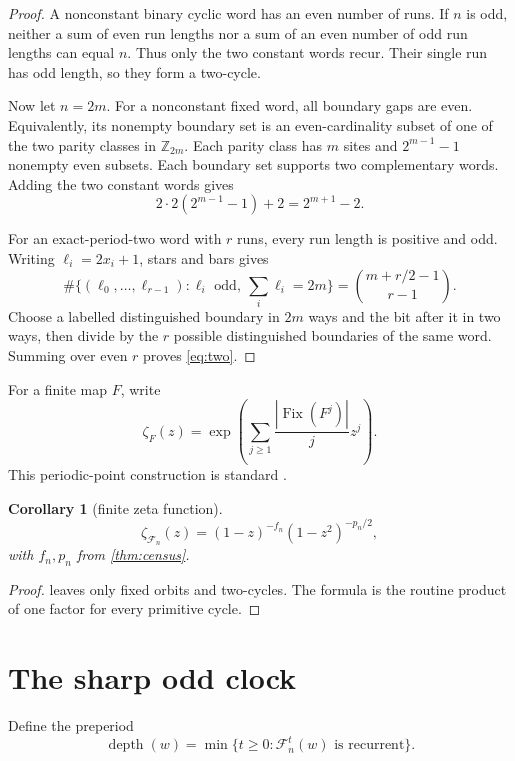 \documentclass[11pt,a4paper]{amsart}
\newtheorem{corollary}[theorem]{Corollary}
\theoremstyle{definition}
\theoremstyle{remark}
\newcommand{\F}{\mathcal F}
\newcommand{\depth}{\operatorname{depth}}
\newcommand{\Fix}{\operatorname{Fix}}
\begin{document}
\begin{proof}
A nonconstant binary cyclic word has an even number of runs.  If \(n\) is
odd, neither a sum of even run lengths nor a sum of an even number of odd
run lengths can equal \(n\).  Thus only the two constant words recur.  Their
single run has odd length, so they form a two-cycle.

Now let \(n=2m\).  For a nonconstant fixed word, all boundary gaps are even.
Equivalently, its nonempty boundary set is an even-cardinality subset of one
of the two parity classes in \(\mathbb Z_{2m}\).  Each parity class has
\(m\) sites and \(2^{m-1}-1\) nonempty even subsets.  Each boundary set
supports two complementary words.  Adding the two constant words gives
\[
       2\cdot2(2^{m-1}-1)+2=2^{m+1}-2.
\]

For an exact-period-two word with \(r\) runs, every run length is positive
and odd.  Writing \(\ell_i=2x_i+1\), stars and bars gives
\[
 \#\{(\ell_0,\ldots,\ell_{r-1}):\ell_i\text{ odd},
       \ \sum_i\ell_i=2m\}
 =\binom{m+r/2-1}{r-1}.
\]
Choose a labelled distinguished boundary in \(2m\) ways and the bit after it
in two ways, then divide by the \(r\) possible distinguished boundaries of
the same word.  Summing over even \(r\) proves \eqref{eq:two}.
\end{proof}

For a finite map \(F\), write
\[
 \zeta_F(z)=\exp\!\left(\sum_{j\ge1}
          \frac{|\Fix(F^j)|}{j}z^j\right).
\]
This periodic-point construction is standard \cite{ArtinMazur1965}.

\begin{corollary}[finite zeta function]\label{cor:zeta}
\[
 \zeta_{\F_n}(z)=(1-z)^{-f_n}(1-z^2)^{-p_n/2},
\]
with \(f_n,p_n\) from \cref{thm:census}.
\end{corollary}

\begin{proof}
 leaves only fixed orbits and two-cycles.  The formula
is the routine product of one factor for every primitive cycle.
\end{proof}



\section{The sharp odd clock}

Define the preperiod
\[
 \depth(w)=\min\{t\ge0:\F_n^t(w)\text{ is recurrent}\}.
\]
\end{document}
